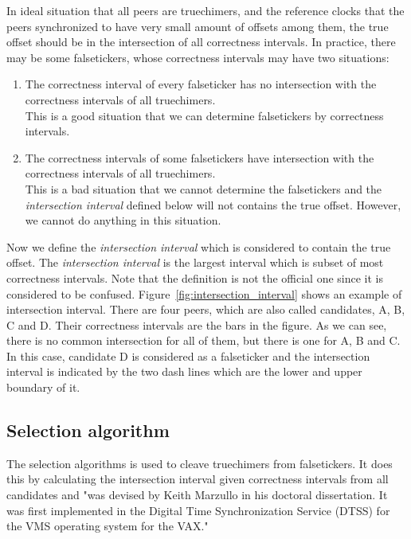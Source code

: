 In ideal situation that all peers are truechimers, and the reference clocks
that the peers synchronized to have very small amount of offsets among them,
the true offset should be in the intersection of all correctness intervals. In
practice, there may be some falsetickers, whose correctness intervals may have
two situations:
\begin{enumerate}
    \item The correctness interval of every falseticker has no intersection
        with the correctness intervals of all truechimers.\\ This is a good
        situation that we can determine falsetickers by correctness intervals.
    \item The correctness intervals of some falsetickers have intersection with
        the correctness intervals of all truechimers.\\ This is a bad situation
        that we cannot determine the falsetickers and the \emph{intersection
        interval} defined below will not contains the true offset.  However, we
        cannot do anything in this situation.
\end{enumerate}

Now we define the \emph{intersection interval} which is considered to contain
the true offset. The \emph{intersection interval} is the largest interval
which is subset of most correctness intervals. Note that the definition is
not the official one since it is considered to be confused.
Figure~\ref{fig:intersection_interval} shows an example of intersection
interval. There are four peers, which are also called candidates, A, B, C and
D. Their correctness intervals are the bars in the figure. As we can see,
there is no common intersection for all of them, but there is one for A, B
and C. In this case, candidate D is considered as a falseticker and the
intersection interval is indicated by the two dash lines which are the lower
and upper boundary of it.



\subsection{Selection algorithm}%
\label{sub:selection_algorithm}
The selection algorithms is used to cleave truechimers from falsetickers. It
does this by calculating the intersection interval given correctness intervals
from all candidates and "was devised by Keith Marzullo in his doctoral
dissertation.  It was first implemented in the Digital Time Synchronization
Service (DTSS) for the VMS operating system for the
VAX\null."~\cite{clock_selection}

